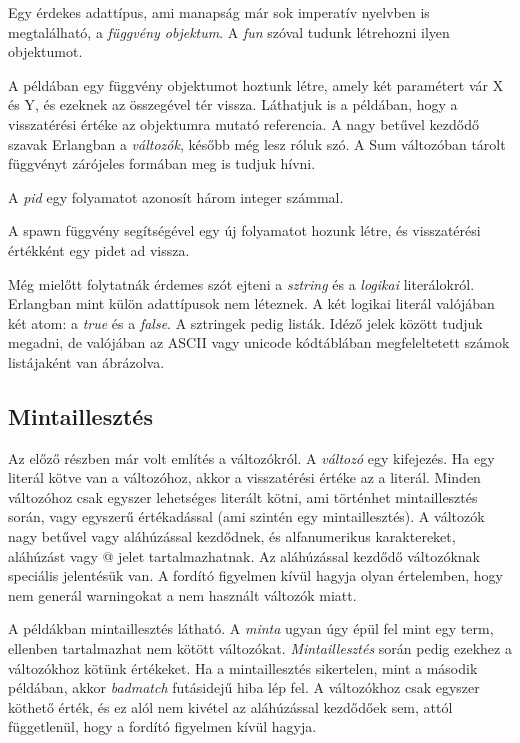 

Egy érdekes adattípus, ami manapság már sok imperatív nyelvben is megtalálható, a \textit{függvény objektum}. A \textit{fun} szóval tudunk létrehozni ilyen objektumot.



A példában egy függvény objektumot hoztunk létre, amely két paramétert vár X és Y, és ezeknek az összegével tér vissza. Láthatjuk is a példában, hogy a visszatérési értéke az objektumra mutató referencia. A nagy betűvel kezdődő szavak Erlangban a \textit{változók}, később még lesz róluk szó. A Sum változóban tárolt függvényt zárójeles formában meg is tudjuk hívni.

A \textit{pid} egy folyamatot azonosít három integer számmal.



A spawn függvény segítségével egy új folyamatot hozunk létre, és visszatérési értékként egy pidet ad vissza.

Még mielőtt folytatnák érdemes szót ejteni a \textit{sztring} és a \textit{logikai} literálokról. Erlangban mint külön adattípusok nem léteznek. A két logikai literál valójában két atom: a \textit{true} és a \textit{false}. A sztringek pedig listák. Idéző jelek között tudjuk megadni, de valójában az ASCII vagy unicode kódtáblában megfeleltetett számok listájaként van ábrázolva.

\subsection{Mintaillesztés}
Az előző részben már volt említés a változókról. A \textit{változó} egy kifejezés. Ha egy literál kötve van a változóhoz, akkor a visszatérési értéke az a literál. Minden változóhoz csak egyszer lehetséges literált kötni, ami történhet mintaillesztés során, vagy egyszerű értékadással (ami szintén egy mintaillesztés). A változók nagy betűvel vagy aláhúzással kezdődnek, és alfanumerikus karaktereket, aláhúzást vagy @ jelet tartalmazhatnak. Az aláhúzással kezdődő változóknak speciális jelentésük van. A fordító figyelmen kívül hagyja olyan értelemben, hogy nem generál warningokat a nem használt változók miatt.



A példákban mintaillesztés látható. A \textit{minta} ugyan úgy épül fel mint egy term, ellenben tartalmazhat nem kötött változókat. \textit{Mintaillesztés} során pedig ezekhez a változókhoz kötünk értékeket. Ha a mintaillesztés sikertelen, mint a második példában, akkor \textit{badmatch} futásidejű hiba lép fel. A változókhoz csak egyszer köthető érték, és ez alól nem kivétel az aláhúzással kezdődőek sem, attól függetlenül, hogy a fordító figyelmen kívül hagyja.

